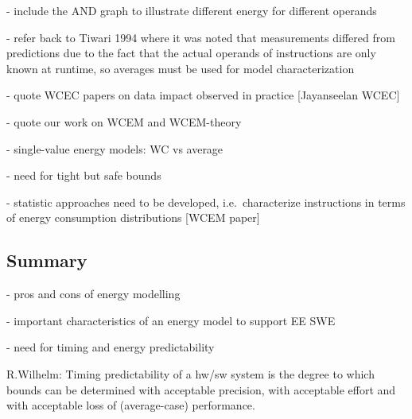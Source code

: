 - include the AND graph to illustrate different energy for different operands 

- refer back to Tiwari 1994 where it was noted that measurements differed from predictions due to the fact that the actual operands of instructions are only known at runtime, so averages must be used for model characterization

- quote WCEC papers on data impact observed in practice [Jayanseelan WCEC]

- quote our work on WCEM and WCEM-theory

- single-value energy models: WC vs average

- need for tight but safe bounds

- statistic approaches need to be developed, i.e.\ characterize instructions in terms of energy consumption distributions [WCEM paper]



\subsection{Summary}

- pros and cons of energy modelling

- important characteristics of an energy model to support EE SWE

- need for timing and energy predictability

R.Wilhelm: Timing predictability of a hw/sw system is the degree to which bounds can be determined with acceptable precision, with acceptable effort and with acceptable loss of (average-case) performance. 
